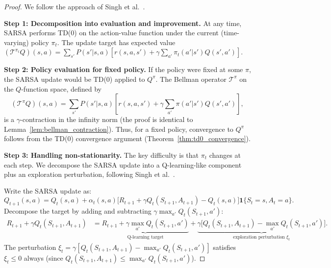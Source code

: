 \documentclass[11pt,a4paper]{article}
\theoremstyle{definition}
\theoremstyle{plain}
\theoremstyle{remark}
\newcommand{\indicator}{\mathbf{1}}
\begin{document}
\begin{proof}
We follow the approach of Singh et al.~\cite{singh2000}.

\textbf{Step 1: Decomposition into evaluation and improvement.} At any time, SARSA performs TD(0) on the action-value function under the current (time-varying) policy $\pi_t$. The update target has expected value $(\mathcal{T}^{\pi_t} Q)(s,a) = \sum_{s'} P(s'|s,a)[r(s,a,s') + \gamma \sum_{a'} \pi_t(a'|s') Q(s',a')]$.

\textbf{Step 2: Policy evaluation for fixed policy.} If the policy were fixed at some $\pi$, the SARSA update would be TD(0) applied to $Q^\pi$. The Bellman operator $\mathcal{T}^\pi$ on the $Q$-function space, defined by
\begin{equation}
    (\mathcal{T}^\pi Q)(s,a) = \sum_{s'} P(s'|s,a)\!\left[r(s,a,s') + \gamma \sum_{a'} \pi(a'|s') Q(s',a')\right],
\end{equation}
is a $\gamma$-contraction in the infinity norm (the proof is identical to Lemma~\ref{lem:bellman_contraction}). Thus, for a fixed policy, convergence to $Q^\pi$ follows from the TD(0) convergence argument (Theorem~\ref{thm:td0_convergence}).

\textbf{Step 3: Handling non-stationarity.} The key difficulty is that $\pi_t$ changes at each step. We decompose the SARSA update into a Q-learning-like component plus an exploration perturbation, following Singh et al.~\cite{singh2000}.

Write the SARSA update as:
\begin{equation}
    Q_{t+1}(s,a) = Q_t(s,a) + \alpha_t(s,a)\bigl[R_{t+1} + \gamma Q_t(S_{t+1}, A_{t+1}) - Q_t(s,a)\bigr]\indicator\{S_t=s, A_t=a\}.
\end{equation}
Decompose the target by adding and subtracting $\gamma\max_{a'} Q_t(S_{t+1}, a')$:
\begin{align}
    R_{t+1} + \gamma Q_t(S_{t+1}, A_{t+1})
    &= \underbrace{R_{t+1} + \gamma\max_{a'} Q_t(S_{t+1}, a')}_{\text{Q-learning target}} + \underbrace{\gamma\bigl[Q_t(S_{t+1}, A_{t+1}) - \max_{a'} Q_t(S_{t+1}, a')\bigr]}_{\text{exploration perturbation } \xi_t}. \label{eq:sarsa_decomp}
\end{align}
The perturbation $\xi_t = \gamma[Q_t(S_{t+1}, A_{t+1}) - \max_{a'} Q_t(S_{t+1}, a')]$ satisfies $\xi_t \leq 0$ always (since $Q_t(S_{t+1}, A_{t+1}) \leq \max_{a'} Q_t(S_{t+1}, a')$).


\end{proof}
\end{document}
